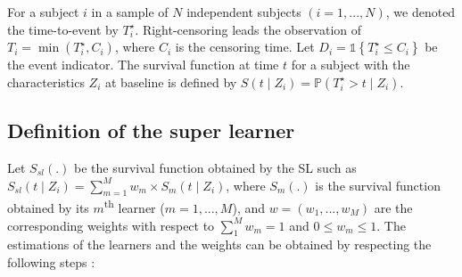 For a subject \(i\) in a sample of \(N\) independent subjects \((i=1,...,N)\), we denoted the time-to-event by \(T_i^\star\). Right-censoring leads the observation of \(T_i=\min(T_i^\star, C_i)\), where \(C_i\) is the censoring time. Let \(D_i= \mathbb{1}\left \lbrace T_i^\star \leq C_i \right \rbrace\) be the event indicator. The survival function at time \(t\) for a subject with the characteristics \(Z_i\) at baseline is defined by \(S(t \mid Z_i ) = \mathbb{P}(T_i^\star> t \mid Z_i)\).

\hypertarget{definition-of-the-super-learner}{%
\subsection{Definition of the super learner}\label{definition-of-the-super-learner}}

Let \(S_{sl}(.)\) be the survival function obtained by the SL such as \(S_{sl}(t \mid Z_i)=\sum_{m=1}^M w_m \times S_m(t \mid Z_i)\), where \(S_m(.)\) is the survival function obtained by its \(m\)\textsuperscript{th} learner (\(m=1,...,M\)), and \(w= (w_1,...,w_M)\) are the corresponding weights with respect to \(\sum_1^M w_m=1\) and \(0 \leq w_m \leq 1\). The estimations of the learners and the weights can be obtained by respecting the following steps \citep{Polley2010}:

